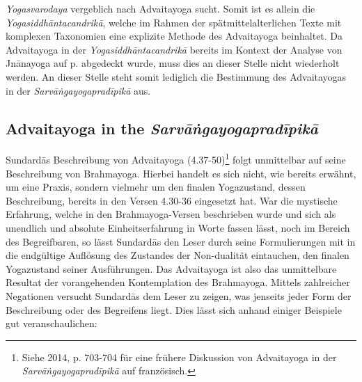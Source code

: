 \textit{Yogasvarodaya} vergeblich nach Advaitayoga sucht. Somit ist es allein die \textit{Yogasiddhāntacandrikā}, welche im Rahmen der spätmittelalterlichen Texte mit komplexen Taxonomien eine explizite Methode des Advaitayoga beinhaltet. Da Advaitayoga in der \textit{Yogasiddhāntacandrikā} bereits im Kontext der Analyse von Jnānayoga auf p.\pageref{jnanayogaintrocandrika} abgedeckt wurde, muss dies an dieser Stelle nicht wiederholt werden. An dieser Stelle steht somit lediglich die Bestimmung des Advaitayogas in der \textit{Sarvāṅgayogapradīpikā} aus.

\subsection{Advaitayoga in the \textit{Sarvāṅgayogapradīpikā}}

Sundardās Beschreibung von Advaitayoga (4.37-50)\footnote{Siehe \citeauthor{burger2014sarvangayogapradipika} 2014, p. 703-704 für eine frühere Diskussion von Advaitayoga in der \textit{Sarvāṅgayogapradīpikā} auf französisch.} folgt unmittelbar auf seine Beschreibung von Brahmayoga. Hierbei handelt es sich nicht, wie bereits erwähnt, um eine Praxis, sondern vielmehr um den finalen Yogazustand, dessen Beschreibung, bereits in den Versen 4.30-36 eingesetzt hat. War die mystische Erfahrung, welche in den Brahmayoga-Versen beschrieben wurde und sich als unendlich und absolute Einheitserfahrung in Worte fassen lässt, noch im Bereich des Begreifbaren, so lässt Sundardās den Leser durch seine Formulierungen mit in die endgültige Auflösung des Zustandes der Non-dualität eintauchen, den finalen Yogazustand seiner Ausführungen. Das Advaitayoga ist also das unmittelbare Resultat der vorangehenden Kontemplation des Brahmayoga. Mittels zahlreicher Negationen versucht Sundardās dem Leser zu zeigen, was jenseits jeder Form der Beschreibung oder des Begreifens liegt. Dies lässt sich anhand einiger Beispiele gut veranschaulichen:

